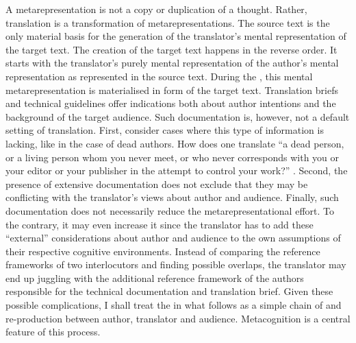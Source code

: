 \documentclass[output=paper]{LSP/langsci}
\begin{document}
A metarepresentation is not a copy or duplication of a thought. Rather, translation is a transformation of metarepresentations. The source text is the only material basis for the generation of the translator's mental representation of the target text. The creation of the target text happens in the reverse order. It starts with the translator's purely mental representation of the author's mental representation as represented in the source text. During the , this mental metarepresentation is materialised in form of the target text. Translation briefs and technical guidelines offer indications both about author intentions and the background of the target audience. Such documentation is, however, not a default setting of translation. First, consider cases where this type of information is lacking, like in the case of dead authors. How does one translate ``a dead person, or a living person whom you never meet, or who never corresponds with you or your editor or your publisher in the attempt to control your work?'' \citep[24]{Robinson2001Who}. Second, the presence of extensive documentation does not exclude that they may be conflicting with the translator's views about author and audience. Finally, such documentation does not necessarily reduce the metarepresentational effort. To the contrary, it may even increase it since the translator has to add these ``external'' considerations about author and audience to the own assumptions of their respective cognitive environments. Instead of comparing the reference frameworks of two interlocutors and finding possible overlaps, the translator may end up juggling with the additional reference framework of the authors responsible for the technical documentation and translation brief. Given these possible complications, I shall treat the  in what follows as a simple chain of  and re-production between author, translator and audience. Metacognition is a central feature of this process. 
\end{document}
